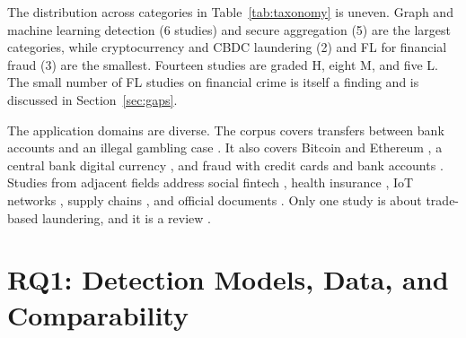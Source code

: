\documentclass[journal]{IEEEtran}
\begin{document}
The distribution across categories in Table~\ref{tab:taxonomy} is uneven. Graph and machine learning detection (6 studies) and secure aggregation (5) are the largest categories, while cryptocurrency and CBDC laundering (2) and FL for financial fraud (3) are the smallest. Fourteen studies are graded H, eight M, and five L. The small number of FL studies on financial crime is itself a finding and is discussed in Section~\ref{sec:gaps}.

The application domains are diverse. The corpus covers transfers between bank accounts \cite{irshad2024gcfmld,mao2026pmegnn} and an illegal gambling case \cite{luo2024mlad}. It also covers Bitcoin and Ethereum \cite{ferretti2025gnn,nayak2026quantum,yu2023aetransgat,wu2024heists}, a central bank digital currency \cite{amber2026cbdc}, and fraud with credit cards and bank accounts \cite{tang2024sdt,li2026plc,awosika2024xai}. Studies from adjacent fields address social fintech \cite{xiong2025hppbefl}, health insurance \cite{kapadiya2022health}, IoT networks \cite{yang2022accountable}, supply chains \cite{dudczyk2024supply}, and official documents \cite{cosmin2024notary}. Only one study is about trade-based laundering, and it is a review \cite{tiwari2025tbml}.

\section{RQ1: Detection Models, Data, and Comparability}
\label{sec:rq1}
\end{document}
